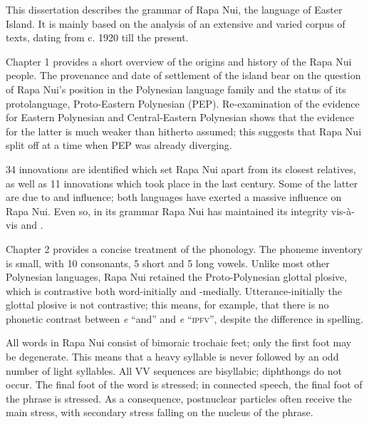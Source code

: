 

This dissertation describes the grammar of Rapa Nui, the language of Easter Island. It is mainly based on the analysis of an extensive and varied corpus of texts, dating from c. 1920 till the present.

\medskip Chapter 1 provides a short overview of the origins and history of the Rapa Nui people. The provenance and date of settlement of the island bear on the question of Rapa Nui’s position in the Polynesian language family and the status of its protolanguage, Proto-Eastern Polynesian (PEP). Re-examination of the evidence for Eastern Polynesian and Central-Eastern Polynesian shows that the evidence for the latter is much weaker than hitherto assumed; this suggests that Rapa Nui split off at a time when PEP was already diverging.

34 innovations are identified which set Rapa Nui apart from its closest relatives, as well as 11 innovations which took place in the last century. Some of the latter are due to  and  influence; both languages have exerted a massive influence on Rapa Nui. Even so, in its grammar Rapa Nui has maintained its integrity vis-à-vis  and .

\medskip Chapter 2 provides a concise treatment of the phonology. The phoneme inventory is small, with 10 consonants, 5 short and 5 long vowels. Unlike most other Polynesian languages, Rapa Nui retained the Proto-Polynesian glottal plosive, which is contrastive both word-initially and -medially. Utterance-initially the glottal plosive is not contrastive; this means, for example, that there is no phonetic contrast between \textit{{\ꞌ}e} “and” and \textit{e} “\textsc{ipfv}”, despite the difference in spelling.

All words in Rapa Nui consist of bimoraic trochaic feet; only the first foot may be degenerate. This means that a heavy syllable is never followed by an odd number of light syllables. All VV sequences are bisyllabic; diphthongs do not occur. The final foot of the word is stressed; in connected speech, the final foot of the phrase is stressed. As a consequence, postnuclear particles often receive the main stress, with secondary stress falling on the nucleus of the phrase.

